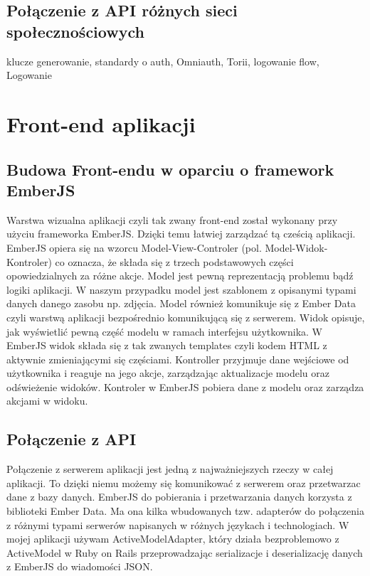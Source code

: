 \documentclass[brudnopis]{xmgr}
\begin{document}
\subsection{Połączenie z API różnych sieci społecznościowych} klucze generowanie, standardy o auth, Omniauth, Torii, logowanie flow, 
Logowanie 

\section{Front-end aplikacji}

\subsection{Budowa Front-endu w oparciu o framework EmberJS }
Warstwa wizualna aplikacji czyli tak zwany front-end został wykonany przy użyciu frameworka EmberJS. Dzięki temu łatwiej zarządzać tą cześcią aplikacji. EmberJS opiera się na wzorcu Model-View-Controler (pol. Model-Widok-Kontroler) co oznacza, że składa się z
trzech podstawowych części opowiedzialnych za różne akcje. Model  jest pewną reprezentacją problemu bądź logiki aplikacji. W naszym przypadku model jest szablonem z opisanymi typami danych danego zasobu np. zdjęcia. Model również komunikuje się z Ember Data czyli warstwą aplikacji bezpośrednio komunikującą się z serwerem.  Widok opisuje, jak wyświetlić pewną część modelu w ramach interfejsu użytkownika. W EmberJS widok składa się z tak zwanych templates czyli kodem HTML z aktywnie zmieniającymi się częściami. Kontroller przyjmuje dane wejściowe od użytkownika i reaguje na jego akcje, zarządzając aktualizacje modelu oraz odświeżenie widoków. Kontroler w EmberJS pobiera dane z modelu oraz zarządza akcjami w widoku.

\subsection{Połączenie z API}
Połączenie z serwerem aplikacji jest jedną z najważniejszych rzeczy w całej aplikacji. To dzięki niemu możemy się komunikować z serwerem oraz przetwarzac dane z bazy danych. EmberJS do pobierania i przetwarzania danych korzysta z biblioteki Ember Data. Ma ona kilka wbudowanych tzw. adapterów do połączenia z różnymi typami serwerów napisanych w różnych językach i technologiach. W mojej aplikacji używam ActiveModelAdapter, który działa bezproblemowo z ActiveModel w Ruby on Rails przeprowadzając serializacje i deserializację danych z EmberJS do wiadomości JSON.
\end{document}
